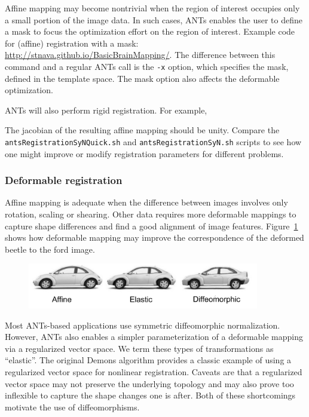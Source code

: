\documentclass{InsightArticle}
\begin{document}
Affine mapping may become nontrivial when the region of interest 
occupies only a small portion of the image data.  In such cases, 
ANTs enables the user to define a mask to focus the optimization 
effort on the region of interest.  
Example code for (affine) registration with a mask: 
\href{http://stnava.github.io/BasicBrainMapping/}{http://stnava.github.io/BasicBrainMapping/}.
The difference between this command 
and a regular ANTs call is the \verb"-x" option, which specifies the mask, defined in the 
template space.   The mask option also affects the deformable
optimization. 



  ANTs will also perform rigid registration.  For example,  

The jacobian of the resulting affine mapping should be unity.  Compare
the \texttt{antsRegistrationSyNQuick.sh} and
\texttt{antsRegistrationSyN.sh} scripts to see how one might improve
or modify registration parameters for different problems.

\subsubsection{Deformable registration}
Affine mapping is adequate when the
difference between images involves only rotation, scaling or shearing.
Other data requires more deformable mappings to capture shape
differences and find a good alignment of image features.
Figure~\ref{fig:antshier} shows how deformable mapping may improve the
correspondence of the deformed beetle to the ford image.
\begin{figure}
\includegraphics[width=0.9\textwidth]{./Figures/ANTSElastToDiff.pdf} 
\vspace{-0.1in}
\label{fig:antshier}
\end{figure}
Most ANTs-based applications use symmetric diffeomorphic normalization.  However, 
ANTs also enables a simpler parameterization of a deformable mapping via a regularized 
vector space.  We term these types of transformations as ``elastic''.  The original Demons algorithm 
provides a classic example of using a regularized vector space for nonlinear registration.  
Caveats are that a regularized vector space may not preserve the underlying topology 
and may also prove too inflexible to capture the shape changes one is after.  Both of these 
shortcomings motivate the use of diffeomorphisms. 
\end{document}
